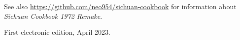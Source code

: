 See also \url{https://github.com/neo954/sichuan-cookbook} for information
about \textit{Sichuan Cookbook 1972 Remake}.

First electronic edition, April 2023.

\endgroup%

